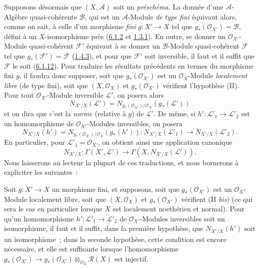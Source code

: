 \begin{env}[6.5.5]
\label{II.6.5.5-fr}
Supposons désormais que $(X,\mathcal{A})$ soit un \emph{préschéma}. La donnée
d'une $\mathcal{A}$-Algèbre quasi-cohérente $\mathcal{B}$, qui est un
$\mathcal{A}$-Module \emph{de type fini} équivaut alors, comme on sait, à
celle d'un morphisme \emph{fini} $g:X'\to X$ tel que
$g_*(\mathcal{O}_{X'})=\mathcal{B}$, défini à un $X$-isomorphisme près
(\hyperref[II.6.1.2-fr]{6.1.2} et \hyperref[II.1.3.1-fr]{1.3.1}). En outre,
se donner un $\mathcal{O}_{X'}$-Module quasi-cohérent $\mathcal{F}'$ équivaut
à se donner un $\mathcal{B}$-Module quasi-cohérent $\mathcal{F}$ tel que
$g_*(\mathcal{F}')=\mathcal{F}$ (\hyperref[II.1.4.3-fr]{1.4.3}), et pour que
$\mathcal{F}'$ soit inversible, il faut et il suffit que $\mathcal{F}$ le soit
(\hyperref[II.6.1.12-fr]{6.1.12}). Pour traduire les résultats précédents en
termes du morphisme fini $g$, il faudra donc supposer, soit que
$g_*(\mathcal{O}_{X'})$ est un $\mathcal{O}_X$-Module \emph{localement libre}
(de type fini), soit que $(X,\mathcal{O}_X)$ et $g_*(\mathcal{O}_{X'})$
vérifient l'hypothèse (II). Pour tout $\mathcal{O}_{X'}$-Module inversible
$\mathcal{L}'$, on posera alors
\[
\label{II.6.5.5.1-fr}
N_{X'/X}(\mathcal{L}')
=N_{g_*(\mathcal{O}_{X'})/\mathcal{O}_X}(g_*(\mathcal{L}'))
\tag{6.5.5.1}
\]
et on dira que c'est la \emph{norme} (relative à $g$) de $\mathcal{L}'$. De
même, si $h':\mathcal{L}'_1\to\mathcal{L}'_2$ est un homomorphisme de
$\mathcal{O}_{X'}$-Modules inversibles, on posera
\[
\label{II.6.5.5.2-fr}
N_{X'/X}(h')
=N_{g_*(\mathcal{O}_{X'})/\mathcal{O}_X}(g_*(h')):
N_{X'/X}(\mathcal{L}'_1)\to N_{X'/X}(\mathcal{L}'_2).
\tag{6.5.5.2}
\]
En particulier, pour $\mathcal{L}'_1=\mathcal{O}_{X'}$, on obtient ainsi une
application canonique
\[
\label{II.6.5.5.3-fr}
N_{X'/X}:\Gamma(X',\mathcal{L}')
\to\Gamma(X,N_{X'/X}(\mathcal{L}')).
\tag{6.5.5.3}
\]
Nous laisserons au lecteur la plupart de ces traductions, et nous bornerons à
expliciter les suivantes~:
\end{env}

\begin{proposition}[6.5.6]
\label{II.6.5.6-fr}
Soit $g:X'\to X$ un morphisme fini, et supposons, soit que
$g_*(\mathcal{O}_{X'})$ est un $\mathcal{O}_X$-Module localement libre, soit
que $(X,\mathcal{O}_X)$ et $g_*(\mathcal{O}_{X'})$ vérifient (II \emph{bis})
(ce qui sera le cas en particulier lorsque $X$ est localement noethérien et
normal). Pour qu'un homomorphisme $h':\mathcal{L}'_1\to\mathcal{L}'_2$ de
$\mathcal{O}_{X'}$-Modules inversibles soit un isomorphisme, il faut et il
suffit, dans la première hypothèse, que $N_{X'/X}(h')$ soit un isomorphisme~;
dans la seconde hypothèse, cette condition est encore nécessaire, et elle est
suffisante lorsque l'homomorphisme
$g_*(\mathcal{O}_{X'})\to
g_*(\mathcal{O}_{X'})\otimes_{\mathcal{O}_X}\mathcal{R}(X)$ est injectif.
\end{proposition}


